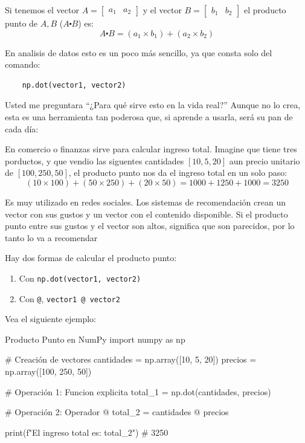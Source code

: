 Si tenemos el vector \(A = \begin{bmatrix}
    a_1 & a_2
\end{bmatrix}\) y el vector \(B = \begin{bmatrix}
    b_1 & b_2
\end{bmatrix}\) el producto punto de \(A, B\) (\(A\centerdot B\)) es:
\[
A \centerdot B = (a_1 \times b_1) + (a_2 \times b_2)
\]

En analisis de datos esto es un poco más sencillo, ya que consta solo del comando:
\begin{verbatim}
    np.dot(vector1, vector2)
\end{verbatim}

Usted me preguntara ``¿Para qué sirve esto en la vida real?'' Aunque no lo crea, esta es una herramienta tan poderosa que, si aprende a usarla, será su pan de cada día:

En comercio o finanzas sirve para calcular ingreso total. Imagine que tiene tres porductos, y que vendio las siguentes cantidades \([10, 5, 20]\)  aun precio unitario de \([100, 250, 50]\), el producto punto nos da el ingreso total en un solo paso:
\[
(10 \times 100) + (50 \times 250) + (20 \times 50) = 1000 + 1250+ 1000 = 3250
\]

Es muy utilizado en redes sociales. Los sistemas de recomendación crean un vector con sus gustos y un vector con el contenido disponible. Si el producto punto entre sus gustos y el vector son altos, significa que son parecidos, por lo tanto lo va a recomendar

Hay dos formas de calcular el producto punto:
\begin{enumerate}
    \item Con \texttt{np.dot(vector1, vector2)}
    \item Con \texttt{@}, \texttt{vector1 @ vector2}
\end{enumerate}

Vea el siguiente ejemplo:
\begin{pycode}{Producto Punto en NumPy}
import numpy as np

# Creación de vectores 
cantidades = np.array([10, 5, 20])
precios = np.array([100, 250, 50])

# Operación 1: Funcion explicita
total_1 = np.dot(cantidades, precios)

# Operación 2: Operador @ 
total_2 = cantidades @ precios

print(f"El ingreso total es: {total_2}") # 3250
\end{pycode}

